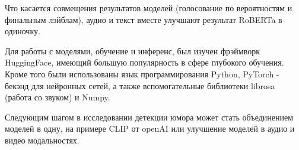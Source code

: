 \documentclass[PMI,VKR]{HSEUniversity}
\begin{document}
Что касается совмещения результатов моделей (голосование по вероятностям и финальным лэйблам), аудио и текст вместе улучшают результат RoBERTa в одиночку.

Для работы с моделями, обучение и инференс, был изучен фрэймворк HuggingFace, имеющий большую популярность в сфере глубокого обучения. Кроме того были использованы язык программирования Python, PyTorch - бекэнд для нейронных сетей, а также вспомогательные библиотеки librosa (работа со звуком) и Numpy.

Следующим шагом в исследовании детекции юмора может стать объединением моделей в одну, на примере CLIP от openAI или улучшение моделей в аудио и видео модальностях.




\putbibliography %
\end{document}
